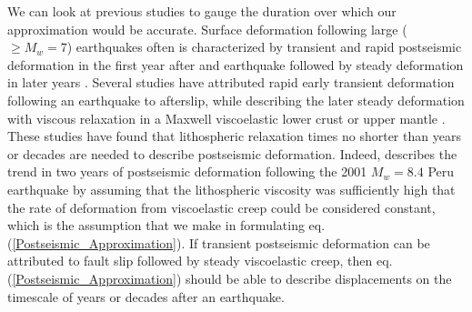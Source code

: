 \documentclass[extra,mreferee]{gji}
\begin{document}
We can look at previous studies to gauge the duration over which
our approximation would be accurate.  Surface deformation following large
($\geq M_w=7$) earthquakes often is characterized by transient and
rapid postseismic deformation in the first year after and earthquake
followed by steady deformation in later years
\citep[e.g.][]{SS1997,S2005,E2009}.  Several studies have attributed
rapid early transient deformation following an earthquake to
afterslip, while describing the later steady deformation with viscous
relaxation in a Maxwell viscoelastic lower crust or upper mantle
\citep[e.g.][]{PA2005,J2009,H2009,F2006,R2015}.  These studies have
found that lithospheric relaxation times no shorter than years or
decades are needed to describe postseismic deformation.  Indeed,
\citet{PA2005} describes the trend in two years of postseismic
deformation following the 2001 $M_w=8.4$ Peru earthquake by assuming
that the lithospheric viscosity was sufficiently high that the rate of
deformation from viscoelastic creep could be considered constant,
which is the assumption that we make in formulating
eq. (\ref{Postseismic_Approximation}). If transient postseismic
deformation can be attributed to fault slip followed by steady
viscoelastic creep, then eq. (\ref{Postseismic_Approximation}) should
be able to describe displacements on the timescale of years or decades
after an earthquake.
\end{document}
